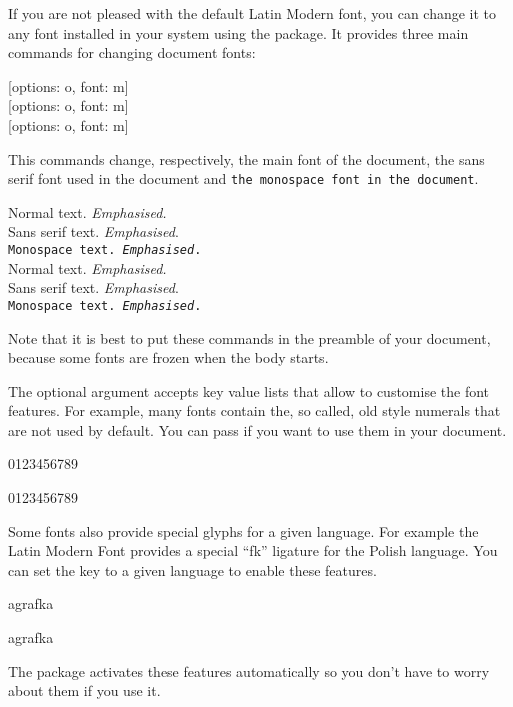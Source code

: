 If you are not pleased with the default Latin Modern font, you can change it to
any font installed in your system using the  package. It provides
three main commands for changing document fonts:
\begin{lscommand}
  [options: o, font: m] \\
  [options: o, font: m] \\
  [options: o, font: m]
\end{lscommand}
This commands change, respectively, the main font of the document, \textsf{the
  sans serif font used in the document} and \texttt{the monospace font in the
  document}.
\begin{example}
Normal text.
  \emph{Emphasised.} \\
\textsf{Sans serif text.
  \emph{Emphasised}.} \\
\texttt{Monospace text.
  \emph{Emphasised}.} \\

\setmainfont{Source Serif Pro}
\setsansfont{Source Sans Pro}
\setmonofont{Source Code Pro}
Normal text.
  \emph{Emphasised.} \\
\textsf{Sans serif text.
  \emph{Emphasised}.} \\
\texttt{Monospace text.
  \emph{Emphasised}.}
\end{example}
Note that it is best to put these commands in the preamble of your document,
because some fonts are frozen when the body starts.

The optional  argument accepts key value lists that allow to
customise the font features. For example, many fonts contain the, so called,
old style numerals that are not used by default. You can pass
 if you want to use them in your document.
\begin{example}
\setmainfont{Source Serif Pro}
0123456789

\setmainfont[
  Numbers=OldStyle,
]{Source Serif Pro}
0123456789
\end{example}

Some fonts also provide special glyphs for a given language. For example the
Latin Modern Font provides a special
\enquote{\setmainfont[Language=Polish]{Latin Modern Roman}fk} ligature for the
Polish language. You can set the  key to a given language to
enable these features.
\begin{example}
agrafka

\setmainfont[
  Language=Polish,
]{Latin Modern Roman}
agrafka
\end{example}
The  package activates these features automatically so you
don't have to worry about them if you use it.

